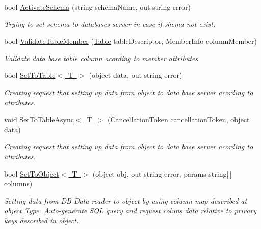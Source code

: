 \begin{DoxyCompactItemize}
bool \mbox{\hyperlink{interface_uniform_data_operator_1_1_sql_1_1_i_sql_operator_a5ae8328a464ef80f1ae1bd46a573c265}{Activate\+Schema}} (string schema\+Name, out string error)
\begin{DoxyCompactList}\small\item\em Trying to set schema to databases server in case if shema not exist. \end{DoxyCompactList}\item 
bool \mbox{\hyperlink{interface_uniform_data_operator_1_1_sql_1_1_i_sql_operator_a3b5fbe97e664e1ef689576ab8757f957}{Validate\+Table\+Member}} (\mbox{\hyperlink{class_uniform_data_operator_1_1_sql_1_1_tables_1_1_attributes_1_1_table}{Table}} table\+Descriptor, Member\+Info column\+Member)
\begin{DoxyCompactList}\small\item\em Validate data base table column acording to member attributes. \end{DoxyCompactList}\item 
bool \mbox{\hyperlink{interface_uniform_data_operator_1_1_sql_1_1_i_sql_operator_a1072f029395858ff11d574ac09011332}{Set\+To\+Table$<$ T $>$}} (object data, out string error)
\begin{DoxyCompactList}\small\item\em Creating request that setting up data from object to data base server acording to attributes. \end{DoxyCompactList}\item 
void \mbox{\hyperlink{interface_uniform_data_operator_1_1_sql_1_1_i_sql_operator_af43c4421b85e52d180763871be8147f6}{Set\+To\+Table\+Async$<$ T $>$}} (Cancellation\+Token cancellation\+Token, object data)
\begin{DoxyCompactList}\small\item\em Creating request that setting up data from object to data base server acording to attributes. \end{DoxyCompactList}\item 
bool \mbox{\hyperlink{interface_uniform_data_operator_1_1_sql_1_1_i_sql_operator_af96d3f0bd2b58dfad705d2bfc3eba8fc}{Set\+To\+Object$<$ T $>$}} (object obj, out string error, params string\mbox{[}$\,$\mbox{]} columns)
\begin{DoxyCompactList}\small\item\em Setting data from DB Data reader to object by using column map described at object Type. Auto-\/generate S\+QL query and request coluns data relative to privary keys described in object. \end{DoxyCompactList}\item 

\end{DoxyCompactItemize}
